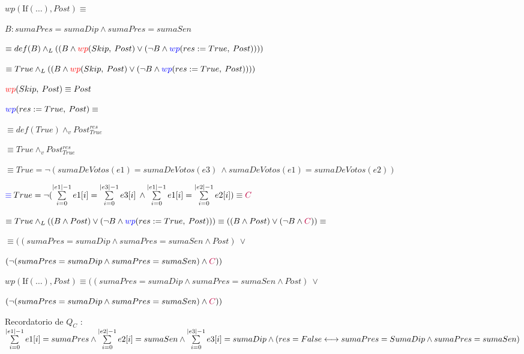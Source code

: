 \documentclass[10pt,a4paper]{article}
\begin{document}
\begin{enumerate}
\quad $wp(\text{If}(\dots), Post) \equiv$

\quad\quad $B : sumaPres = sumaDip \land sumaPres = sumaSen$

\quad\quad $\equiv def(B) \land_L ((B \land \textcolor{red}{wp}(Skip, \: Post) \lor (\neg B \land \textcolor{blue}{wp}(res := True , \: Post))))$

\quad\quad $\equiv True \land_L ((B \land \textcolor{red}{wp}(Skip, \: Post) \lor (\neg B \land \textcolor{blue}{wp}(res := True, \: Post))))$

\quad\quad\quad $\textcolor{red}{wp}(Skip, \: Post) \equiv Post$

\quad\quad\quad $\textcolor{blue}{wp}(res := True, \: Post) \equiv$

\quad\quad\quad\quad $\equiv def(True) \land_v Post^{res}_{True}$

\quad\quad\quad\quad $\equiv True \land_v Post^{res}_{True}$

\quad\quad\quad\quad $\equiv True = \neg{(sumaDeVotos(e1) = sumaDeVotos(e3) \: \land sumaDeVotos(e1) = sumaDeVotos(e2))}$

\quad\quad\quad\quad $\textcolor{blue}{\equiv} \: True = \neg(\sum\limits_{i=0}^{|e1| - 1} e1[i] = \sum\limits_{i=0}^{|e3| - 1} e3[i] \: \land
 \sum\limits_{i=0}^{|e1| - 1} e1[i] = \sum\limits_{i=0}^{|e2| - 1} e2[i]) \equiv \textcolor{purple}{C}$ 

\quad\quad $\equiv True \land_L ((B \land Post) \lor (\neg B \land \textcolor{blue}{wp}(res := True, \: Post))) \equiv 
((B \land Post) \lor (\neg{B} \land \textcolor{purple}{C})) \equiv$

\quad\quad $\equiv ((sumaPres = sumaDip \land sumaPres = sumaSen \land Post) \: \lor$ 

\quad\quad\quad $(\neg{(sumaPres = sumaDip \land sumaPres = sumaSen) \land \textcolor{purple}{C}}))$

\vspace{1mm} 

\quad $ wp(\text{If}(\dots), Post) \equiv ((sumaPres = sumaDip \land sumaPres = sumaSen \land Post) \: \lor$ 

\quad\quad $(\neg{(sumaPres = sumaDip \land sumaPres = sumaSen) \land \textcolor{purple}{C}}))$

\vspace{3mm} 

Recordatorio de $Q_C$ : $\sum\limits_{i=0}^{|e1| - 1} e1[i] = sumaPres \land \sum\limits_{i=0}^{|e2| - 1} e2[i] = sumaSen \land \sum\limits_{i=0}^{|e3| - 1} e3[i] = sumaDip \land \\ 
 (res = False \longleftrightarrow sumaPres = SumaDip \land sumaPres = sumaSen)$


\end{enumerate}
\end{document}

